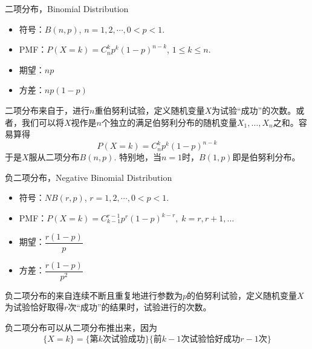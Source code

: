 \begin{frame}

\begin{block}{二项分布，Binomial Distribution}
\begin{itemize}
\item 符号：$B(n,p)$, \; $n = 1,2,\cdots, 0<p<1$.
\item PMF：$P(X = k) = C_n^kp^k(1-p)^{n-k}$, \; $1\le k \le n$.
\item 期望：$np$
\item 方差：$np(1-p)$
\end{itemize}

\vspace{1em}
\pause

二项分布来自于，进行$n$重伯努利试验，定义随机变量$X$为试验``成功''的次数。或者，我们可以将$X$视作是$n$个独立的满足伯努利分布的随机变量$X_1,\ldots,X_n$之和。容易算得
\[P(X=k) = C_n^kp^k(1-p)^{n-k}\]
于是$X$服从二项分布$B(n,p)$. 特别地，当$n=1$时，$B(1,p)$即是伯努利分布。
\end{block}

\end{frame}


\begin{frame}

\begin{block}{负二项分布，Negative Binomial Distribution}
\begin{itemize}
\item 符号：$NB(r,p)$, \; $r = 1,2,\cdots, 0<p<1$.
\item PMF：$P(X = k) = C_{k-1}^{r-1} p^r(1-p)^{k-r}, \; k = r, r+1, \ldots$
\item 期望：$\dfrac{r(1-p)}{p}$
\item 方差：$\dfrac{r(1-p)}{p^2}$
\end{itemize}

\vspace{1em}
\pause

负二项分布的来自连续不断且重复地进行参数为$p$的伯努利试验，定义随机变量$X$为试验恰好取得$r$次``成功''的结果时，试验进行的次数。

负二项分布可以从二项分布推出来，因为
\[\{X=k\} = \{\text{第$k$次试验成功}\}\{\text{前$k-1$次试验恰好成功$r-1$次}\}\]
\end{block}

\end{frame}


